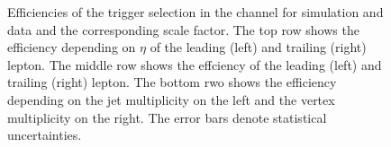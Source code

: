 \begin{figure}[htbp!]
\begin{center}
      \caption{Efficiencies of the trigger selection in the \mumu channel for simulation and data and the corresponding scale factor. The top row shows the efficiency depending on $\eta$ of the leading (left) and trailing (right) lepton. The middle row shows the effciency \pt of the leading (left) and trailing (right) lepton. The bottom rwo shows the efficiency depending on the jet multiplicity on the left and the vertex multiplicity on the right.
      The error bars denote statistical uncertainties. }  
      
    \label{fig:MET_mumu}
  \end{center}
\end{figure}

